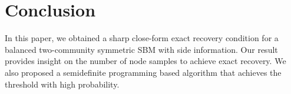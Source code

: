 \documentclass[conference]{IEEEtran}
\DeclareMathOperator{\Bern}{Bern}
\begin{document}

	\section{Conclusion}\label{s:conclusion}In this paper, we obtained a sharp close-form exact recovery condition for a balanced two-community symmetric SBM with side information. %
	Our result provides insight on the number of node samples to achieve exact recovery. We also proposed a semidefinite programming based algorithm that achieves the threshold with high probability.
	
	
\end{document}
